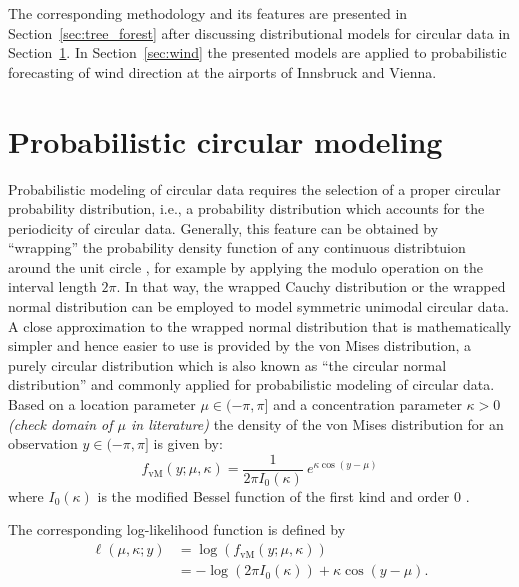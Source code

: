 \documentclass[nojss]{jss}
\newcommand{\fixme}[1]{\emph{\marginpar{FIXME} (#1)}}
\numberwithin{equation}{section}
\begin{document}
The corresponding methodology and its features are presented in Section~\ref{sec:tree_forest} after
discussing distributional models for circular data in Section~\ref{sec:prob_circ}.
In Section~\ref{sec:wind} the presented models are applied to probabilistic forecasting of wind direction
at the airports of Innsbruck and Vienna.



\section{Probabilistic circular modeling}
\label{sec:prob_circ}
Probabilistic modeling of circular data requires the selection of a proper circular
probability distribution, i.e., a probability distribution which accounts for the periodicity
of circular data.
Generally, this feature can be obtained by ``wrapping'' the probability density function
of any continuous distribtuion around the unit circle \citep{Mardia+Jupp:2009}, for example by
applying the modulo operation on the interval length $2\pi$.
In that way, the wrapped Cauchy distribution or the wrapped normal distribution can be employed to model symmetric unimodal circular data.
A close approximation to the wrapped normal distribution that is mathematically simpler and hence easier 
to use \citep{Fisher:1993} is provided by the von Mises distribution,
a purely circular distribution which is also known as ``the circular normal distribution''
and commonly applied for probabilistic modeling of circular data.
Based on a location parameter $\mu \in (-\pi, \pi]$ and a concentration parameter $\kappa > 0$ 
\fixme{check domain of $\mu$ in literature}
the density of the von Mises distribution for an observation $y \in (-\pi, \pi]$ is given by:
\begin{equation}
  f_\mathrm{vM}(y; \mu, \kappa) = \frac{1}{2 \pi I_0(\kappa)}~e^{ \kappa \cos(y - \mu)}\label{schlosser:equ_vm}
\end{equation}
where $I_0(\kappa)$ is the modified Bessel function of the first kind and order $0$
\citep[see, e.g.,][for a more detailed overview]{Jammalamadaka+Sengupta:2001}.

The corresponding log-likelihood function is defined by
\begin{equation}
\begin{aligned}
\ell(\mu, \kappa; y) &= \log(f_\mathrm{vM}(y;\mu, \kappa)) \\
&= -\log(2 \pi I_0(\kappa)) +  \kappa \cos(y - \mu).
\end{aligned}
\end{equation}
\end{document}

